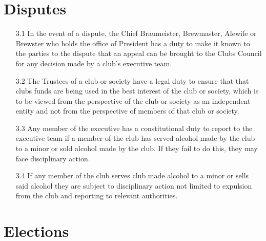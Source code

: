 \documentclass{article}
\begin{document}
\section{Disputes}

\begin{enumerate}
    \item[3.1] In the event of a dispute, the Chief Braumeister, Brewmaster, Alewife or Brewster who holds the office of President has a duty to make it known to the parties to the dispute that an appeal can be brought to the Clubs Council for any decision made by a club’s executive team.
    \item[3.2] The Trustees of a club or society have a legal duty to ensure that that clubs funds are being used in the best interest of the club or society, which is to be viewed from the perspective of the club or society as an independent entity and not from the perspective of members of that club or society.
    \item[3.3] Any member of the executive has a constitutional duty to report to the executive team if a member of the club has served alcohol made by the club to a minor or sold alcohol made by the club. If they fail to do this, they may face disciplinary action.
    \item[3.4] If any member of the club serves club made alcohol to a minor or sells said alcohol they are subject to disciplinary action not limited to expulsion from the club and reporting to relevant authorities.
\end{enumerate}

\section{Elections}
\end{document}
